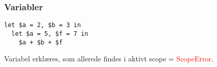 \begin{frame}[fragile]
\frametitle{Variabler}
\begin{lstlisting}
let $a = 2, $b = 3 in 
  let $a = 5, $f = 7 in
    $a + $b + $f
\end{lstlisting}
\begin{center}

Variabel erklæres, som allerede findes i aktivt scope = \textcolor{red}{ScopeError}.

\end{center}
\end{frame}



